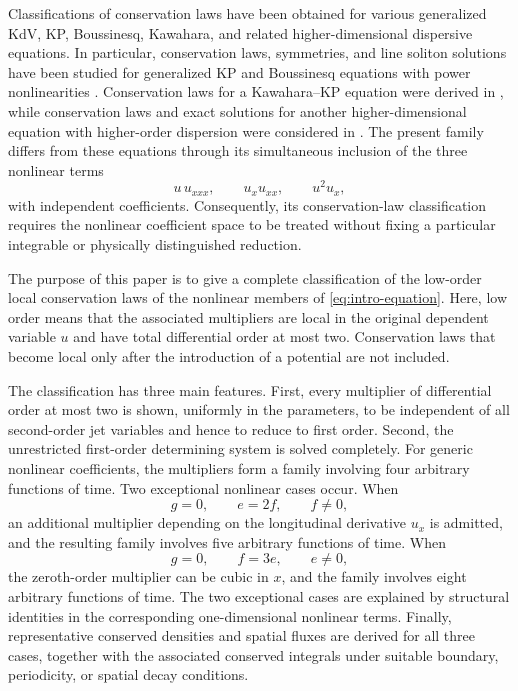 \documentclass[11pt]{article}
\numberwithin{equation}{section}
\theoremstyle{definition}
\theoremstyle{remark}
\begin{document}
Classifications of conservation laws have been obtained for various
generalized KdV, KP, Boussinesq, Kawahara, and related
higher-dimensional dispersive equations. In particular,
conservation laws, symmetries, and line soliton solutions have been
studied for generalized KP and Boussinesq equations with power
nonlinearities \cite{AncoGandariasRecio2018}. Conservation laws for a
Kawahara--KP equation were derived in
\cite{MarquezLozanoGandariasAnco2023}, while conservation laws and
exact solutions for another higher-dimensional equation with
higher-order dispersion were considered in
\cite{AliSeadawyHusnine2019}. The present family differs from these
equations through its simultaneous inclusion of the three nonlinear
terms
\[
u\,u_{xxx},
\qquad
u_xu_{xx},
\qquad
u^2u_x,
\]
with independent coefficients. Consequently, its conservation-law
classification requires the nonlinear coefficient space to be
treated without fixing a particular integrable or physically
distinguished reduction.

The purpose of this paper is to give a complete classification of
the low-order local conservation laws of the nonlinear members of
\eqref{eq:intro-equation}. Here, low order means that the associated
multipliers are local in the original dependent variable $u$ and have
total differential order at most two. Conservation laws that become
local only after the introduction of a potential are not included.

The classification has three main features. First, every multiplier
of differential order at most two is shown, uniformly in the
parameters, to be independent of all second-order jet variables and
hence to reduce to first order. Second, the unrestricted first-order
determining system is solved completely. For generic nonlinear
coefficients, the multipliers form a family involving four arbitrary
functions of time. Two exceptional nonlinear cases occur. When
\[
g=0,
\qquad
e=2f,
\qquad
f\neq0,
\]
an additional multiplier depending on the longitudinal derivative
$u_x$ is admitted, and the resulting family involves five arbitrary
functions of time. When
\[
g=0,
\qquad
f=3e,
\qquad
e\neq0,
\]
the zeroth-order multiplier can be cubic in $x$, and the family
involves eight arbitrary functions of time. The two exceptional cases
are explained by structural identities in the corresponding
one-dimensional nonlinear terms. Finally, representative conserved
densities and spatial fluxes are derived for all three cases, together
with the associated conserved integrals under suitable boundary,
periodicity, or spatial decay conditions.
\end{document}
